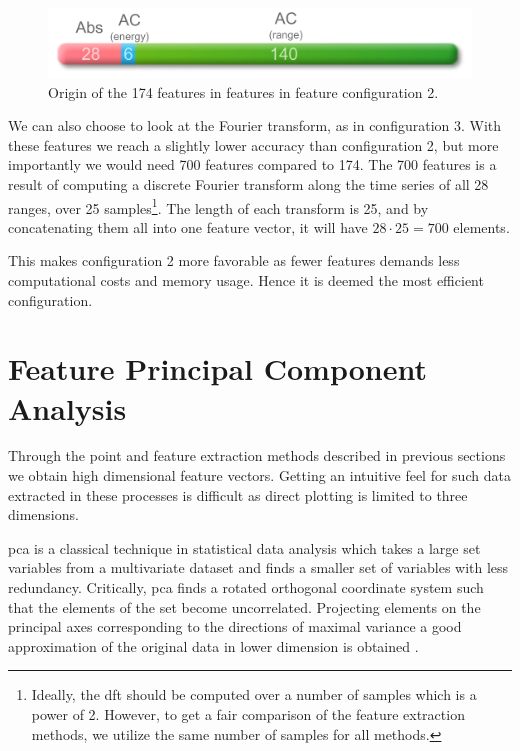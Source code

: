 \begin{figure}[h]
	\centering
	\includegraphics[scale=0.8]{figs_temp/features.jpg}
	\caption{Origin of the 174 features in features in feature configuration 2.}
	\label{fig:feat_fig}
\end{figure}

We can also choose to look at the Fourier transform, as in configuration 3. With these features we reach a slightly lower accuracy than configuration 2, but more importantly we would need 700 features compared to 174. The 700 features is a result of computing a discrete Fourier transform along the time series of all 28 ranges, over 25 samples\footnote{Ideally, the \gls{dft} should be computed over a number of samples which is a power of 2. However, to get a fair comparison of the feature extraction methods, we utilize the same number of samples for all methods.}. The length of each transform is 25, and by concatenating them all into one feature vector, it will have $28\cdot 25=700$ elements.

This makes configuration 2 more favorable as fewer features demands less computational costs and memory usage. Hence it is deemed the most efficient configuration.


\section{Feature Principal Component Analysis}

Through the point and feature extraction methods described in previous sections we obtain high dimensional feature vectors. Getting an intuitive feel for such data extracted in these processes is difficult as direct plotting is limited to three dimensions. 

\gls{pca} is  a classical technique in statistical data analysis which takes a large set variables from a multivariate dataset and finds a smaller set of variables with less redundancy. Critically, \gls{pca} finds a rotated orthogonal coordinate system such that the elements of the set become uncorrelated. Projecting elements on the principal axes corresponding to the directions of maximal variance a good approximation of the original data in lower dimension is obtained \citep{hyvasrinen_karhunen_oja_2004}.


